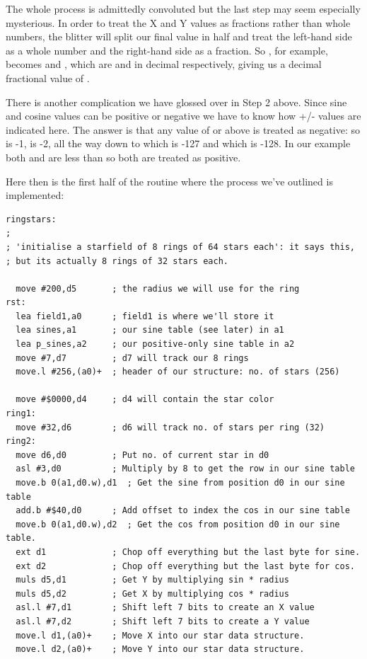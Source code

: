 The whole process is admittedly convoluted but the last step may seem especially mysterious. In order to treat the X and Y values
as fractions rather than whole numbers, the blitter will split our final value in half and treat the left-hand side as a whole number
and the right-hand side as a fraction. So , for example, becomes  and , which are  and 
in decimal respectively, giving us a decimal fractional value of .

There is another complication we have glossed over in Step 2 above. Since sine and cosine values can be positive or negative
we have to know how +/- values are indicated here. The answer is that any value of  or above is treated
as negative: so  is -1,  is -2, all the way down to  which is -127 and
 which is -128. In our example both  and  are less than  so both are
treated as positive.

Here then is the first half of the  routine where the process we've outlined is implemented:

\begin{lstlisting}[caption=Populating the data structure for the starfield used in the Tempest 2000 credits screen.]
ringstars:
;
; 'initialise a starfield of 8 rings of 64 stars each': it says this,
; but its actually 8 rings of 32 stars each.

  move #200,d5       ; the radius we will use for the ring
rst:
  lea field1,a0      ; field1 is where we'll store it
  lea sines,a1       ; our sine table (see later) in a1
  lea p_sines,a2     ; our positive-only sine table in a2
  move #7,d7         ; d7 will track our 8 rings
  move.l #256,(a0)+  ; header of our structure: no. of stars (256)
  
  move #$0000,d4     ; d4 will contain the star color
ring1:
  move #32,d6        ; d6 will track no. of stars per ring (32)
ring2:
  move d6,d0         ; Put no. of current star in d0 
  asl #3,d0          ; Multiply by 8 to get the row in our sine table
  move.b 0(a1,d0.w),d1  ; Get the sine from position d0 in our sine table
  add.b #$40,d0      ; Add offset to index the cos in our sine table   
  move.b 0(a1,d0.w),d2  ; Get the cos from position d0 in our sine table.
  ext d1             ; Chop off everything but the last byte for sine.
  ext d2             ; Chop off everything but the last byte for cos.
  muls d5,d1         ; Get Y by multiplying sin * radius
  muls d5,d2         ; Get X by multiplying cos * radius
  asl.l #7,d1        ; Shift left 7 bits to create an X value
  asl.l #7,d2        ; Shift left 7 bits to create a Y value
  move.l d1,(a0)+    ; Move X into our star data structure.
  move.l d2,(a0)+    ; Move Y into our star data structure.
\end{lstlisting}

